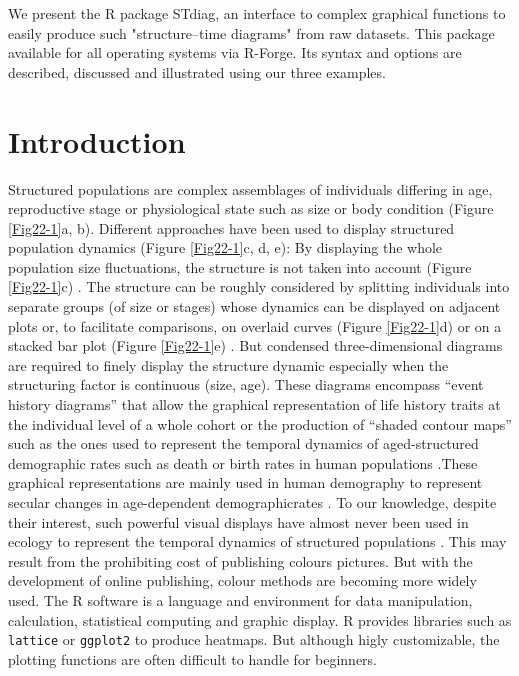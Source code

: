   We present the R package STdiag, an interface to complex graphical
  functions to easily produce such "structure--time diagrams" from raw datasets.
  This package available for all operating systems via R-Forge. Its syntax and
  options are described, discussed and illustrated using our three examples.

\section{Introduction}

Structured populations are complex assemblages of individuals differing in age,
reproductive stage or physiological state such as size or body condition (Figure
\ref{Fig22-1}a, b). Different approaches have been used to display structured
population dynamics (Figure \ref{Fig22-1}c, d, e): By displaying the whole population size fluctuations,
the structure is not taken into account (Figure \ref{Fig22-1}c) \autocites{schrautzer2011a}.
The structure can be roughly considered by splitting individuals into separate
groups (of size or stages) whose dynamics can be displayed on adjacent plots
\autocites{plaistow2009a} or, to facilitate comparisons, on overlaid curves (Figure
\ref{Fig22-1}d) or on a stacked bar plot (Figure \ref{Fig22-1}e) \autocites{madsen2000a}. But condensed
three-dimensional diagrams are required to finely display the structure dynamic
especially when the structuring factor is continuous (size, age). These diagrams
encompass “event history diagrams” that allow the graphical representation of
life history traits at the individual level of a whole
cohort\autocites{carey1998a,carey2008a} or the production of “shaded contour
maps” such as the ones used to represent the temporal dynamics of
aged-structured demographic rates such as death or birth rates in human
populations \autocites{vaupel1997a,vaupel1998a}.These graphical representations
are mainly used in human demography to represent secular changes in
age-dependent demographicrates
\autocites{vaupel1987a,vaupel1997a,vaupel1998a,andreev2000a,erlangsen2003a}.
To our knowledge, despite their interest, such powerful visual displays have
almost never been used in ecology to represent the temporal dynamics of
structured populations \autocites{faerovig2002a}. This may result from the
prohibiting cost of publishing colours pictures. But with the development of
online publishing, colour methods are becoming more widely used.
The R software \autocites{team2012a} is a language and environment for data
manipulation, calculation, statistical computing and graphic display. R provides
libraries such as \texttt{lattice} \autocites{sarkar2008a} or \texttt{ggplot2}
\autocites{wickham2009a} to produce heatmaps.
But although higly customizable, the plotting functions are often difficult to
handle for beginners.

